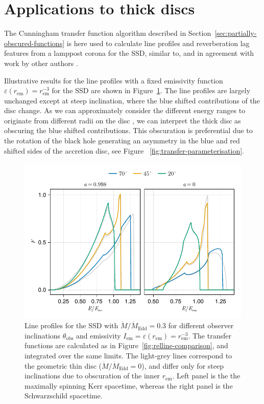 \documentclass[fleqn,usenatbib]{mnras}
\newcommand{\rhoem}{r_\text{em}}
\begin{document}
\section{Applications to thick discs}
\label{sec:applications}

The Cunningham transfer function algorithm described in
Section~\ref{sec:partially-obscured-functions} is here used to calculate line
profiles and reverberation lag features from a lamppost corona for the SSD,
similar to, and in agreement with work by other authors
\citep{taylor_exploring_2018,taylor_x-ray_2018}.

Illustrative results for the line profiles with a fixed emissivity function
$\varepsilon(\rhoem) = \rhoem^{-3}$ for the SSD are shown in
Figure~\ref{fig:line-profile-ssd}. The line profiles are largely unchanged
except at steep inclination, where the blue shifted contributions of the disc
change.  As we can approximately consider the different energy ranges to
originate from different radii on the disc \cite{gates_on_2024}, we can
interpret the thick disc as obscuring the blue shifted contributions. This
obscuration is preferential due to the rotation of the black hole generating an
asymmetry in the blue and red shifted sides of the accretion disc, see Figure~
\ref{fig:transfer-parameterisation}.

\begin{figure}
    \centering
    \includegraphics[width=0.99\columnwidth]{figures/lineprofiles.ssd.pdf}
    \caption{Line profiles for the SSD with $\dot{M} / \dot{M}_\text{Edd} = 0.3$
    for different observer inclinations $\theta_\text{obs}$ and emissivity
$I_\text{em} = \varepsilon(\rhoem) = \rhoem^{-3}$. The transfer functions are
calculated as in Figure~\ref{fig:relline-comparison}, and integrated over the
same limits. The light-grey lines correspond to the geometric thin disc
($\dot{M} / \dot{M}_\text{Edd} = 0$), and differ only for steep inclinations due
to obscuration of the inner $\rhoem$. Left panel is the the maximally spinning
Kerr spacetime, whereas the right panel is the Schwarzschild spacetime.}
    \label{fig:line-profile-ssd}
\end{figure}
\end{document}
